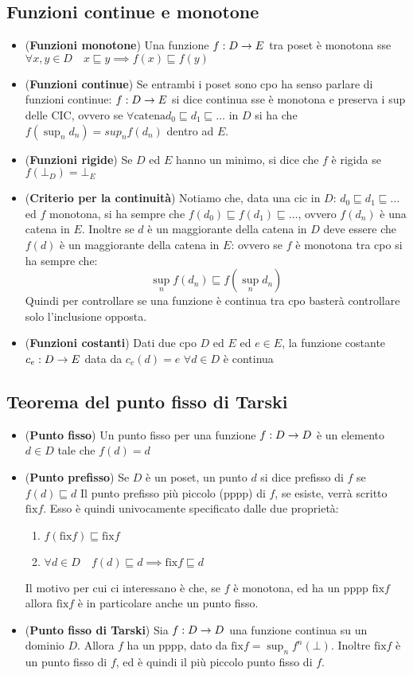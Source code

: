 \documentclass[a4paper,NoNotes,GeneralMath]{stdmdoc}
\newcommand{\sle}{\sqsubseteq}
\newcommand{\fix}{\mbox{fix}}
\begin{document}
\subsection*{Funzioni continue e monotone}
\begin{itemize}
\item ({\bf Funzioni monotone}) Una funzione $f: D \rightarrow E$ tra poset è monotona sse $\forall x, y \in D \quad x \sle y \implies f(x) \sle f(y)$
\item ({\bf Funzioni continue}) Se entrambi i poset sono cpo ha senso parlare di funzioni continue: $f: D \rightarrow E$ si dice continua sse è monotona e preserva i sup delle CIC, ovvero se $\forall \mbox{catena} d_0 \sle d_1 \sle \ldots$ in $D$ si ha che $f(\sup_n d_n) = sup_n f(d_n)$ dentro ad $E$.
\item ({\bf Funzioni rigide}) Se $D$ ed $E$ hanno un minimo, si dice che $f$ è rigida se $f(\bot_D) = \bot_E$
\item ({\bf Criterio per la continuità}) Notiamo che, data una cic in $D$: $d_0 \sle d_1 \sle \ldots$ ed $f$ monotona, si ha sempre che $f(d_0) \sle f(d_1) \sle \ldots$, ovvero $f(d_n)$ è una catena in $E$. Inoltre se $d$ è un maggiorante della catena in $D$ deve essere che $f(d)$ è un maggiorante della catena in $E$: ovvero se $f$ è monotona tra cpo si ha sempre che:
  $$\sup_n f(d_n) \sle f(\sup_n d_n)$$
  Quindi per controllare se una funzione è continua tra cpo basterà controllare solo l'inclusione opposta.
\item ({\bf Funzioni costanti}) Dati due cpo $D$ ed $E$ ed $e \in E$, la funzione costante $c_e: D \rightarrow E$ data da $c_e(d) = e$ $\forall d \in D$ è continua
\end{itemize}

\subsection*{Teorema del punto fisso di Tarski}
\begin{itemize}
\item ({\bf Punto fisso}) Un punto fisso per una funzione $f: D \rightarrow D$ è un elemento $d \in D$ tale che $f(d) = d$
\item ({\bf Punto prefisso}) Se $D$ è un poset, un punto $d$ si dice prefisso di $f$ se $f(d) \sle d$
  Il punto prefisso più piccolo (pppp) di $f$, se esiste, verrà scritto $\fix f$. Esso è quindi univocamente specificato dalle due proprietà:
  \begin{enumerate}
  \item $f(\fix f) \sle \fix f$
  \item $\forall d \in D \quad f(d) \sle d \implies \fix f \sle d$
  \end{enumerate}

  Il motivo per cui ci interessano è che, se $f$ è monotona, ed ha un pppp $\fix f$ allora $\fix f$ è in particolare anche un punto fisso.
\item ({\bf Punto fisso di Tarski}) Sia $f: D \rightarrow D$ una funzione continua su un dominio $D$. Allora $f$ ha un pppp, dato da $\fix f = \sup_n f^n(\bot)$. Inoltre $\fix f$ è un punto fisso di $f$, ed è quindi il più piccolo punto fisso di $f$.
\end{itemize}
\end{document}
